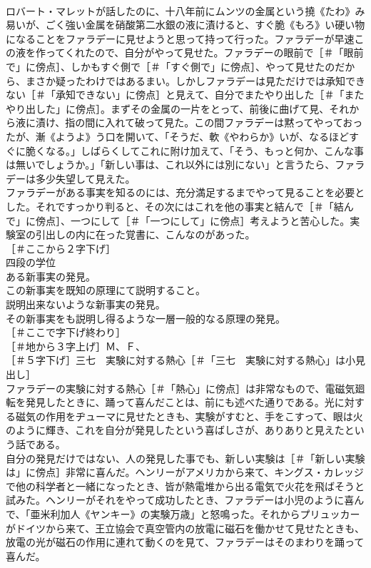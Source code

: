 \documentclass[8pt]{extreport}
\begin{document}
\begin{CJK}{UTF8}{min}
\\	ロバート・マレットが話したのに、十八年前にムンツの金属という撓《たわ》み易いが、ごく強い金属を硝酸第二水銀の液に漬けると、すぐ脆《もろ》い硬い物になることをファラデーに見せようと思って持って行った。ファラデーが早速この液を作ってくれたので、自分がやって見せた。ファラデーの眼前で［＃「眼前で」に傍点］、しかもすぐ側で［＃「すぐ側で」に傍点］、やって見せたのだから、まさか疑ったわけではあるまい。しかしファラデーは見ただけでは承知できない［＃「承知できない」に傍点］と見えて、自分でまたやり出した［＃「またやり出した」に傍点］。まずその金属の一片をとって、前後に曲げて見、それから液に漬け、指の間に入れて破って見た。この間ファラデーは黙ってやっておったが、漸《ようよ》う口を開いて、「そうだ、軟《やわらか》いが、なるほどすぐに脆くなる。」しばらくしてこれに附け加えて、「そう、もっと何か、こんな事は無いでしょうか。」「新しい事は、これ以外には別にない」と言うたら、ファラデーは多少失望して見えた。
\\	ファラデーがある事実を知るのには、充分満足するまでやって見ることを必要とした。それですっかり判ると、その次にはこれを他の事実と結んで［＃「結んで」に傍点］、一つにして［＃「一つにして」に傍点］考えようと苦心した。実験室の引出しの内に在った覚書に、こんなのがあった。
\\	［＃ここから２字下げ］
\\	四段の学位
\\	ある新事実の発見。
\\	この新事実を既知の原理にて説明すること。
\\	説明出来ないような新事実の発見。
\\	その新事実をも説明し得るような一層一般的なる原理の発見。
\\	［＃ここで字下げ終わり］
\\	［＃地から３字上げ］Ｍ、Ｆ、
\\	［＃５字下げ］三七　実験に対する熱心［＃「三七　実験に対する熱心」は小見出し］
\\	ファラデーの実験に対する熱心［＃「熱心」に傍点］は非常なもので、電磁気廻転を発見したときに、踊って喜んだことは、前にも述べた通りである。光に対する磁気の作用をヂューマに見せたときも、実験がすむと、手をこすって、眼は火のように輝き、これを自分が発見したという喜ばしさが、ありありと見えたという話である。
\\	自分の発見だけではない、人の発見した事でも、新しい実験は［＃「新しい実験は」に傍点］非常に喜んだ。ヘンリーがアメリカから来て、キングス・カレッジで他の科学者と一緒になったとき、皆が熱電堆から出る電気で火花を飛ばそうと試みた。ヘンリーがそれをやって成功したとき、ファラデーは小児のように喜んで、「亜米利加人《ヤンキー》の実験万歳」と怒鳴った。それからプリュッカーがドイツから来て、王立協会で真空管内の放電に磁石を働かせて見せたときも、放電の光が磁石の作用に連れて動くのを見て、ファラデーはそのまわりを踊って喜んだ。

\end{CJK}
\end{document}
